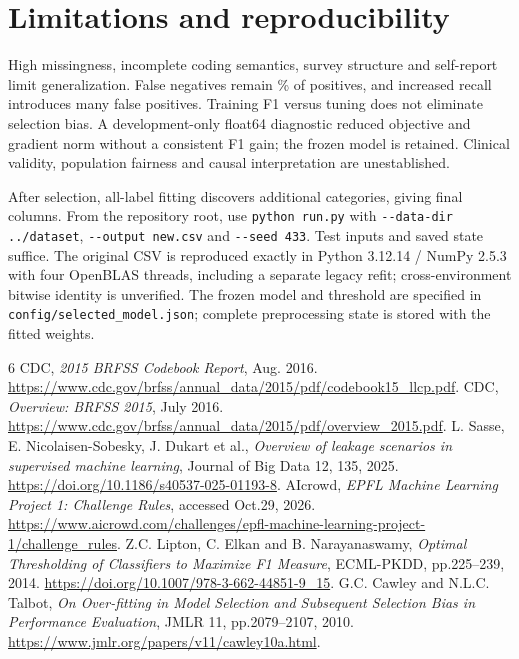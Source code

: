 \documentclass[10pt,conference,compsocconf]{IEEEtran}
\begin{document}
\section{Limitations and reproducibility}
High missingness, incomplete coding semantics, survey structure and self-report
limit generalization. False negatives remain \HoldFNRPercent{}\% of positives,
and increased recall introduces many false positives.
Training F1 \TrainingFone{} versus tuning \TuningFone{} does not eliminate
selection bias. A development-only float64 diagnostic reduced objective and
gradient norm without a consistent F1 gain; the frozen model is retained.
Clinical validity, population fairness and causal interpretation are unestablished.

After selection, all-label fitting discovers additional categories, giving
\FinalDimension{} final columns.
From the repository root, use \texttt{python run.py} with
\texttt{-{}-data-dir ../dataset}, \texttt{-{}-output new.csv} and \texttt{-{}-seed 433}.
Test inputs and saved state suffice. The original CSV is reproduced exactly
in Python 3.12.14 / NumPy 2.5.3 with four OpenBLAS threads, including a separate
legacy refit; cross-environment bitwise identity is unverified.
The frozen model and threshold are specified in
\texttt{config/selected\_model.json}; complete preprocessing state is stored
with the fitted weights.

\clearpage
\begin{thebibliography}{6}
 CDC, \emph{2015 BRFSS Codebook Report}, Aug. 2016.
\url{https://www.cdc.gov/brfss/annual_data/2015/pdf/codebook15_llcp.pdf}.
 CDC, \emph{Overview: BRFSS 2015}, July 2016.
\url{https://www.cdc.gov/brfss/annual_data/2015/pdf/overview_2015.pdf}.
 L. Sasse, E. Nicolaisen-Sobesky, J. Dukart et al.,
\emph{Overview of leakage scenarios in supervised machine learning},
Journal of Big Data 12, 135, 2025.
\url{https://doi.org/10.1186/s40537-025-01193-8}.
 AIcrowd, \emph{EPFL Machine Learning Project 1: Challenge Rules},
accessed Oct.29, 2026.
\url{https://www.aicrowd.com/challenges/epfl-machine-learning-project-1/challenge_rules}.
 Z.C. Lipton, C. Elkan and B. Narayanaswamy,
\emph{Optimal Thresholding of Classifiers to Maximize F1 Measure},
ECML-PKDD, pp.225--239, 2014.
\url{https://doi.org/10.1007/978-3-662-44851-9_15}.
 G.C. Cawley and N.L.C. Talbot,
\emph{On Over-fitting in Model Selection and Subsequent Selection Bias in
Performance Evaluation}, JMLR 11, pp.2079--2107, 2010.
\url{https://www.jmlr.org/papers/v11/cawley10a.html}.
\end{thebibliography}
\end{document}

